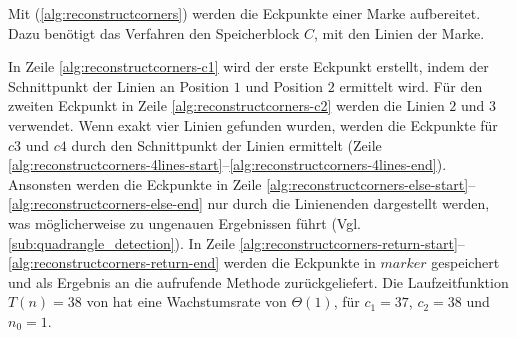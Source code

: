 Mit  (\autoref{alg:reconstructcorners}) werden die Eckpunkte einer Marke aufbereitet. Dazu
 benötigt das Verfahren den Speicherblock $C$, mit den Linien der Marke.

In Zeile \ref{alg:reconstructcorners-c1} wird der erste Eckpunkt erstellt, indem der Schnittpunkt der Linien an
 Position $1$ und Position $2$ ermittelt wird. Für den zweiten Eckpunkt in Zeile \ref{alg:reconstructcorners-c2} werden
 die Linien $2$ und $3$ verwendet. Wenn exakt vier Linien gefunden wurden, werden die Eckpunkte für $\mathit{c3}$ und
 $\mathit{c4}$ durch den Schnittpunkt der Linien ermittelt (Zeile
 \ref{alg:reconstructcorners-4lines-start}--\ref{alg:reconstructcorners-4lines-end}). Ansonsten werden die Eckpunkte in
 Zeile \ref{alg:reconstructcorners-else-start}--\ref{alg:reconstructcorners-else-end} nur durch die Linienenden
 dargestellt werden, was möglicherweise zu ungenauen Ergebnissen führt (Vgl. \autoref{sub:quadrangle_detection}). In
 Zeile \ref{alg:reconstructcorners-return-start}--\ref{alg:reconstructcorners-return-end} werden die Eckpunkte in
 $\mathit{marker}$ gespeichert und als Ergebnis an die aufrufende Methode zurückgeliefert. Die Laufzeitfunktion
 $T(n) = 38$ von  hat eine Wachstumsrate von $\Theta(1)$, für $c_{1} = 37$, $c_{2} = 38$
 und $n_{0} = 1$.

